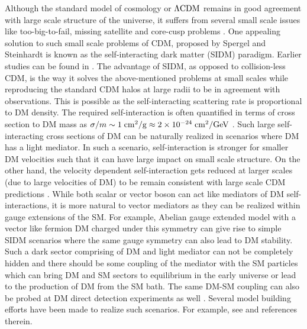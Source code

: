 \documentclass[prd,nofootinbib,preprint,superscriptaddress]{revtex4}
\begin{document}
	
	Although the standard model of cosmology or ${\rm \Lambda CDM}$ remains in good agreement with large scale structure of the universe, it suffers from several small scale issues like too-big-to-fail, missing satellite and core-cusp problems \cite{Tulin:2017ara, Bullock:2017xww}. One appealing solution to such small scale problems of CDM, proposed by Spergel and Steinhardt \cite{Spergel:1999mh} is known as the self-interacting dark matter (SIDM) paradigm. Earlier studies can be found in \cite{Carlson:1992fn, deLaix:1995vi}. The advantage of SIDM, as opposed to collision-less CDM, is the way it solves the above-mentioned problems at small scales while reproducing the standard CDM halos at large radii to be in agreement with observations. This is possible as the self-interacting scattering rate is proportional to DM density. The required self-interaction is often quantified in terms of cross section to DM mass as $\sigma/m \sim 1 \; {\rm cm}^2/{\rm g} \approx 2 \times 10^{-24} \; {\rm cm}^2/{\rm GeV}$ \cite{Buckley:2009in, Feng:2009hw, Feng:2009mn, Loeb:2010gj, Zavala:2012us, Vogelsberger:2012ku}. Such large self-interacting cross sections of DM can be naturally realized in scenarios where DM has a light mediator. In such a scenario, self-interaction is stronger for smaller DM velocities such that it can have large impact on small scale structure. On the other hand, the velocity dependent self-interaction gets reduced at larger scales (due to large velocities of DM) to be remain consistent with large scale CDM predictions \cite{Buckley:2009in, Feng:2009hw, Feng:2009mn, Loeb:2010gj, Bringmann:2016din, Kaplinghat:2015aga, Aarssen:2012fx, Tulin:2013teo}. While both scalar or vector boson can act like mediators of DM self-interactions, it is more natural to vector mediators as they can be realized within gauge extensions of the SM. For example, Abelian gauge extended model with a vector like fermion DM charged under this symmetry can give rise to simple SIDM scenarios where the same gauge symmetry can also lead to DM stability. Such a dark sector comprising of DM and light mediator can not be completely hidden and there should be some coupling of the mediator with the SM particles which can bring DM and SM sectors to equilibrium in the early universe or lead to the production of DM from the SM bath. The same DM-SM coupling can also be probed at DM direct detection experiments as well \cite{Kaplinghat:2013yxa, DelNobile:2015uua}. Several model building efforts have been made to realize such scenarios. For example, see \cite{Kouvaris:2014uoa, Bernal:2015ova, Kainulainen:2015sva, Hambye:2019tjt, Cirelli:2016rnw, Kahlhoefer:2017umn, Dutta:2021wbn, Borah:2021yek} and references therein.
	
\end{document}
